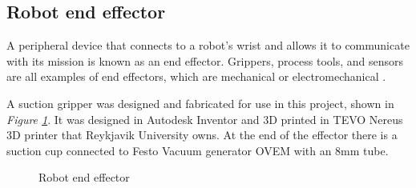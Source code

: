\subsection{Robot end effector\label{subsec:robotend}}
A peripheral device that connects to a robot's wrist and allows it to communicate with its mission is known as an end effector. Grippers, process tools, and sensors are all examples of end effectors, which are mechanical or electromechanical \cite{wilson_relative_1996}. 

A suction gripper was designed and fabricated for use in this project, shown in \textit{Figure \ref{figure: endeffector}}.
It was designed in Autodesk Inventor \cite{noauthor_professional-grade_nodate} and 3D printed in TEVO Nereus 3D printer that Reykjavik University owns. At the end of the effector there is a suction cup connected to Festo Vacuum generator OVEM with an 8mm tube.
\begin{figure}[ht]
 \centering
 \hfill
 \hfill
 \caption{Robot end effector}
 \label{figure: endeffector}
\end{figure}

